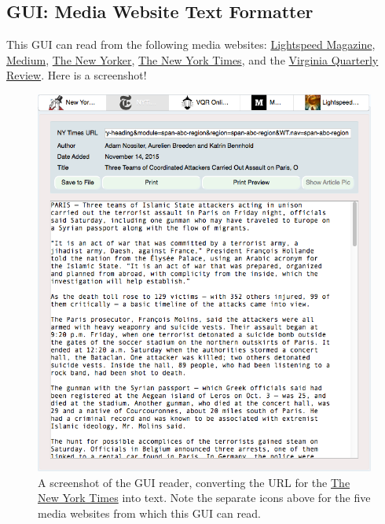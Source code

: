 \documentclass[]{article}
\begin{document}
\subsection{GUI: Media Website Text Formatter}
This GUI can read from the following media websites:
\href{http://www.lightspeedmagazine.com/}{Lightspeed Magazine},
\href{https://medium.com/}{Medium},
\href{http://www.newyorker.com/}{The New Yorker},
\href{http://www.nytimes.com/?WT.z_jog=1}{The New York Times}, and the
\href{http://www.vqronline.org/}{Virginia Quarterly Review}. Here is a
screenshot!
\begin{figure}[!ht]
\begin{minipage}[!ht]{0.65\linewidth}
 \includegraphics[width=\linewidth]{images/gui_screenshot.png}
\end{minipage} \hfill
\begin{minipage}[!ht]{0.34\linewidth}
 \caption{A screenshot of the GUI reader, converting the URL for
      the \href{http://www.nytimes.com}{The New York Times} into
      text. Note the separate icons above for the five media websites
      from which this GUI can read.} \label{fig:gui_screenshot}
\end{minipage}
\end{figure}
\end{document}

